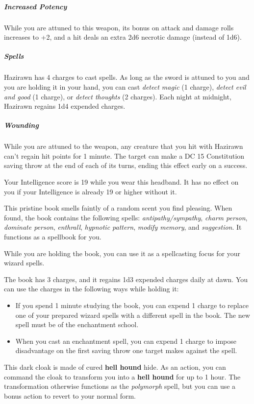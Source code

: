 \documentclass[10pt,a4paper,twoside,bg=print,twocolumn,openany,nodeprecatedcode]{dndbook}
\begin{document}
\subparagraph{Increased Potency}
While you are attuned to this weapon, its bonus on attack and damage rolls increases to +2, and a hit deals an extra 2d6 necrotic damage (instead of 1d6).

\subparagraph{Spells}
Hazirawn has 4 charges to cast spells. As long as the sword is attuned to you and you are holding it in your hand, you can cast \textit{detect magic} (1 charge), \textit{detect evil and good} (1 charge), or \textit{detect thoughts} (2 charges). Each night at midnight, Hazirawn regains 1d4 expended charges.

\subparagraph{Wounding}
While you are attuned to the weapon, any creature that you hit with Hazirawn can't regain hit points for 1 minute. The target can make a DC 15 Constitution saving throw at the end of each of its turns, ending this effect early on a success.

Your Intelligence score is 19 while you wear this headband. It has no effect on you if your Intelligence is already 19 or higher without it.

This pristine book smells faintly of a random scent you find pleasing. When found, the book contains the following spells: \textit{antipathy/sympathy}, \textit{charm person}, \textit{dominate person}, \textit{enthrall}, \textit{hypnotic pattern}, \textit{modify memory}, and \textit{suggestion}. It functions as a spellbook for you.

While you are holding the book, you can use it as a spellcasting focus for your wizard spells.

The book has 3 charges, and it regains 1d3 expended charges daily at dawn. You can use the charges in the following ways while holding it:


\begin{itemize}
\item If you spend 1 minute studying the book, you can expend 1 charge to replace one of your prepared wizard spells with a different spell in the book. The new spell must be of the enchantment school.
\item When you cast an enchantment spell, you can expend 1 charge to impose disadvantage on the first saving throw one target makes against the spell.
\end{itemize}

This dark cloak is made of cured \textbf{hell hound} hide. As an action, you can command the cloak to transform you into a \textbf{hell hound} for up to 1 hour. The transformation otherwise functions as the \textit{polymorph} spell, but you can use a bonus action to revert to your normal form.
\end{document}
